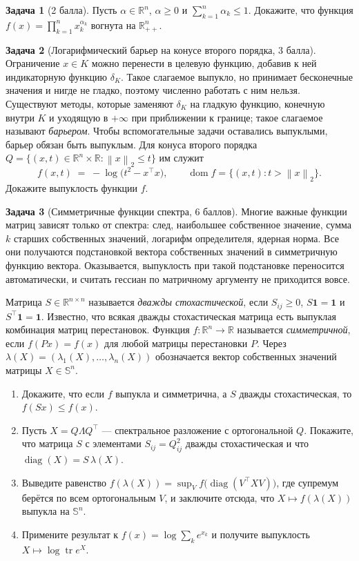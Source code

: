 \documentclass[11pt]{article}
\theoremstyle{definition}
\newtheorem{problem}{Задача}
\theoremstyle{remark}
\DeclareMathOperator{\tr}{tr}
\DeclareMathOperator{\diag}{diag}
\DeclareMathOperator{\dom}{dom}
\newcommand{\R}{\mathbb{R}}
\newcommand{\Sym}{\mathbb{S}}
\newcommand{\norm}[1]{\left\lVert #1 \right\rVert}
\newcommand{\ones}{\mathbf{1}}
\begin{document}
\begin{problem}[2 балла]
Пусть $\alpha \in \R^{n}$, $\alpha \ge 0$ и $\sum_{k=1}^{n} \alpha_k \le 1$. Докажите, что функция
$f(x) = \prod_{k=1}^{n} x_k^{\alpha_k}$ вогнута на $\R^{n}_{++}$.
\end{problem}

\begin{problem}[Логарифмический барьер на конусе второго порядка, 3 балла]
Ограничение $x \in K$ можно перенести в целевую функцию, добавив к ней индикаторную функцию $\delta_K$. Такое слагаемое выпукло, но принимает бесконечные значения и нигде не гладко, поэтому численно работать с ним нельзя. Существуют методы, которые заменяют $\delta_K$ на гладкую функцию, конечную внутри $K$ и уходящую в $+\infty$ при приближении к границе; такое слагаемое называют \emph{барьером}. Чтобы вспомогательные задачи оставались выпуклыми, барьер обязан быть выпуклым.
Для конуса второго порядка
$Q = \{(x,t) \in \R^{n} \times \R : \norm{x}_2 \le t\}$ им служит
\[
f(x, t) \;=\; -\log\bigl(t^{2} - x^{\top} x\bigr),
\qquad \dom f = \{(x,t) : t > \norm{x}_2\} .
\]
Докажите выпуклость функции $f$.
\end{problem}

\begin{problem}[Симметричные функции спектра, 6 баллов]
Многие важные функции матриц зависят только от спектра: след, наибольшее собственное значение, сумма $k$ старших собственных значений, логарифм определителя, ядерная норма. Все они получаются подстановкой вектора собственных значений в симметричную функцию вектора. Оказывается, выпуклость при такой подстановке переносится автоматически, и считать гессиан по матричному аргументу не приходится вовсе.

Матрица $S \in \R^{n \times n}$ называется \emph{дважды стохастической}, если $S_{ij} \ge 0$,
$S \ones = \ones$ и $S^{\top} \ones = \ones$. Известно, что всякая дважды стохастическая матрица есть выпуклая комбинация матриц перестановок.
Функция $f \colon \R^{n} \to \R$ называется \emph{симметричной}, если $f(Px) = f(x)$ для любой
матрицы перестановки $P$. Через $\lambda(X) = (\lambda_1(X), \dots, \lambda_n(X))$ обозначается
вектор собственных значений матрицы $X \in \Sym^{n}$.
\begin{enumerate}[label=(\alph*), nosep]
  \item Докажите, что если $f$ выпукла и симметрична, а $S$ дважды стохастическая, то
        $f(Sx) \le f(x)$.
  \item Пусть $X = Q \Lambda Q^{\top}$ --- спектральное разложение с ортогональной $Q$. Покажите,
        что матрица $S$ с элементами $S_{ij} = Q_{ij}^{2}$ дважды стохастическая и что
        $\diag(X) = S\,\lambda(X)$.
  \item Выведите равенство
        $f(\lambda(X)) = \sup_{V} f\bigl(\diag(V^{\top} X V)\bigr)$, где супремум берётся по всем
        ортогональным $V$, и заключите отсюда, что $X \mapsto f(\lambda(X))$ выпукла на $\Sym^{n}$.
  \item Примените результат к $f(x) = \log \sum_k e^{x_k}$ и получите выпуклость
        $X \mapsto \log \tr e^{X}$.
\end{enumerate}
\end{problem}
\end{document}
